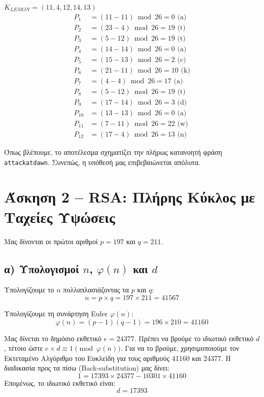 \documentclass[12pt, a4paper]{article}
\begin{document}
\begin{center}
$K_{LEMON} = (11, 4, 12, 14, 13)$
\begin{align*}
P_1 &= (11 - 11)\bmod{26} = 0 \text{ (a)} \\
P_2 &= (23 - 4)\bmod{26} = 19 \text{ (t)} \\
P_3 &= (5 - 12)\bmod{26} = 19 \text{ (t)} \\
P_4 &= (14 - 14)\bmod{26} = 0 \text{ (a)} \\
P_5 &= (15 - 13)\bmod{26} = 2 \text{ (c)} \\
P_6 &= (21 - 11)\bmod{26} = 10 \text{ (k)} \\
P_7 &= (4 - 4)\bmod{26} = 17 \text{ (a)} \\
P_8 &= (5 - 12)\bmod{26} = 19 \text{ (t)} \\
P_9 &= (17 - 14)\bmod{26} = 3 \text{ (d)} \\
P_{10} &= (13 - 13)\bmod{26} = 0 \text{ (a)} \\
P_{11} &= (7 - 11)\bmod{26} = 22 \text{ (w)} \\
P_{12} &= (17 - 4)\bmod{26} = 13 \text{ (n)}
\end{align*}
\end{center}

Όπως βλέπουμε, το αποτέλεσμα σχηματίζει την πλήρως κατανοητή φράση \texttt{attackatdawn}. Συνεπώς, η υπόθεσή μας επιβεβαιώνεται απόλυτα.

\section*{Άσκηση 2 – RSA: Πλήρης Κύκλος με Ταχείες Υψώσεις}

Μας δίνονται οι πρώτοι αριθμοί $p=197$ και $q=211$.

\subsection*{α) Υπολογισμοί $n$, $\varphi(n)$ και $d$}

Υπολογίζουμε το $n$ πολλαπλασιάζοντας τα $p$ και $q$:
\[ n = p \times q = 197 \times 211 = 41567 \]

\noindent Υπολογίζουμε τη συνάρτηση Euler $\varphi(n)$:
\[ \varphi(n) = (p-1)(q-1) = 196 \times 210 = 41160 \]

\noindent Μας δίνεται το δημόσιο εκθετικό $e = 24377$. Πρέπει να βρούμε το ιδιωτικό εκθετικό $d$, τέτοιο ώστε $e \times d \equiv 1 \pmod{\varphi(n)}$. Για να το βρούμε, χρησιμοποιούμε τον Εκτεταμένο Αλγόριθμο του Ευκλείδη για τους αριθμούς 41160 και 24377. Η διαδικασία προς τα πίσω (Back-substitution) μας δίνει:
\[ 1 = 17393 \times 24377 - 10301 \times 41160 \]
Επομένως, το ιδιωτικό εκθετικό είναι:
\[ d = 17393 \]
\end{document}
